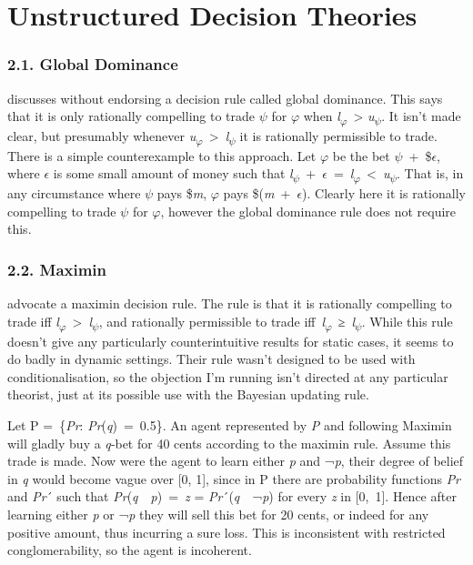 \hypertarget{unstructured-decision-theories}{%
\section{Unstructured Decision
Theories}\label{unstructured-decision-theories}}

\hypertarget{global-dominance}{%
\subsubsection{2.1. Global Dominance}\label{global-dominance}}

\citet{Hajek2000} discusses without endorsing a decision rule called
global dominance. This says that it is only rationally compelling to
trade $\psi$ for $\varphi$ when \emph{l}\textsubscript{$\varphi$}~\textgreater{}
\emph{u}\textsubscript{$\psi$}. It isn't made clear, but presumably whenever
\emph{u}\textsubscript{$\varphi$}~\textgreater{}~\emph{l}\textsubscript{$\psi$} it is
rationally permissible to trade. There is a simple counterexample to
this approach. Let $\varphi$ be the bet $\psi$~+~\$$\epsilon$, where $\epsilon$ is some small amount of
money such that
\emph{l}\textsubscript{$\psi$}~+~$\epsilon$~=~\emph{l}\textsubscript{$\varphi$}~\textless{}~\emph{u}\textsubscript{$\psi$}.
That is, in any circumstance where $\psi$ pays \$\emph{m}, $\varphi$ pays
\$(\emph{m}~+~$\epsilon$). Clearly here it is rationally compelling to trade $\psi$
for $\varphi$, however the global dominance rule does not require this.

\hypertarget{maximin}{%
\subsubsection{2.2. Maximin}\label{maximin}}
\citet{GilboaSchmeidler1993} advocate a maximin decision rule. The rule
is that it is rationally compelling to trade iff
\emph{l}\textsubscript{$\varphi$}~\textgreater{}~\emph{l}\textsubscript{$\psi$}, and
rationally permissible to trade
iff~\emph{l}\textsubscript{$\varphi$}~≥~\emph{l}\textsubscript{$\psi$}. While this
rule doesn't give any particularly counterintuitive results for static
cases, it seems to do badly in dynamic settings. Their rule wasn't
designed to be used with conditionalisation, so the objection I'm
running isn't directed at any particular theorist, just at its possible
use with the Bayesian updating rule.

Let P =~\{\emph{Pr}: \emph{Pr}(\emph{q})~=~0.5\}. An agent represented
by \emph{P} and following Maximin will gladly buy a \emph{q}‑bet for 40
cents according to the maximin rule. Assume this trade is made. Now were
the agent to learn either \emph{p} and ¬\emph{p}, their degree of belief
in \emph{q} would become vague over {[}0, 1{]}, since in P there are
probability functions \emph{Pr} and \emph{Pr}´ such that
\emph{Pr}(\emph{q}~\textbar{}~\emph{p})~=~\emph{z} =
\emph{Pr}´(\emph{q}~\textbar{}~¬\emph{p}) for every \emph{z} in
{[}0,~1{]}. Hence after learning either \emph{p} or ¬\emph{p} they will
sell this bet for 20 cents, or indeed for any positive amount, thus
incurring a sure loss. This is inconsistent with restricted
conglomerability, so the agent is incoherent.

